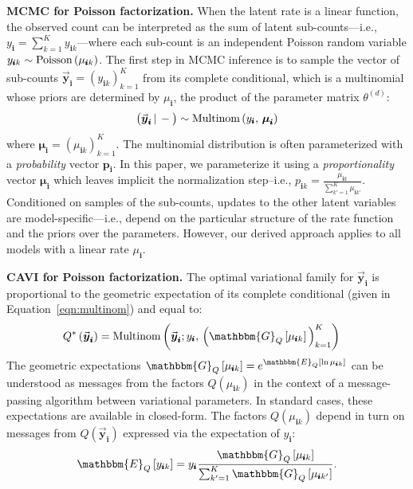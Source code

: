 \documentclass{article}
\newcommand{\subs}{\pmb{i}}
\newcommand{\ysk}{y_{\subs k}}
\newcommand{\ys}{y_{\subs}}
\newcommand{\mus}{\mu_{\subs}}
\newcommand{\musk}{\mu_{\subs k}}
\newcommand{\yvs}{\vec{\boldsymbol{y}}_{\subs}}
\newcommand{\Multi}[1]{\textup{Multinom}\left( #1 \right)}
\newcommand{\Pois}[1]{\textup{Poisson}\left( #1 \right)}
\newcommand{\Eq}[1]{\mathbbm{E}_Q\left[#1\right]}
\newcommand{\Gq}[1]{\mathbbm{G}_Q\left[#1\right]}
\newcommand{\given}{\,|\,}
\newcommand{\teq}{\!=\!}
\newcommand{\compcond}[1]{\big(#1\given-\big)}
\begin{document}
  \textbf{MCMC for Poisson factorization.} When the latent rate is a linear
  function, the observed count can be interpreted as the sum of latent
  sub-counts---i.e., $\ys = \sum_{k=1}^K \ysk$---where each sub-count is an
  independent Poisson random variable $\ysk \sim \Pois{\musk}$. The first step
  in MCMC inference is to sample the vector of sub-counts $\yvs \teq
  \left(\ysk\right)_{k=1}^K$ from its complete conditional, which is a
  multinomial whose priors are determined by $\mus$, the product of the
  parameter matrix $\theta^{(d)}$:
  \begin{equation}
  \label{eqn:multinom}
  \compcond{\yvs} \sim \Multi{\ys,\, \boldsymbol{\mu}_{\subs}}
  \end{equation}
  where $\boldsymbol{\mu}_{\subs}\teq \left(\musk\right)_{k=1}^K$. The
  multinomial distribution is often parameterized with a \emph{probability}
  vector $\boldsymbol{p}_{\subs}$. In this paper, we parameterize it using a
  \emph{proportionality} vector $\boldsymbol{\mu}_{\subs}$ which leaves implicit
  the normalization step--i.e., $p_{\subs k} = \frac{\musk}{\sum_{k'=1}^K
  \mu_{\subs k'}}$. Conditioned on samples of the sub-counts, updates to the
  other latent variables are model-specific---i.e., depend on the particular
  structure of the rate function and the priors over the parameters. However,
  our derived approach applies to all models with a linear rate $\mus$. 
  
  \textbf{CAVI for Poisson factorization.} The optimal variational family for
  $\yvs$ is proportional to the geometric expectation of its complete
  conditional (given in Equation~\ref{eqn:multinom}) and equal to:
  \begin{align}
  Q^*\left(\yvs\right) 
  &= \Multi{\yvs; \ys,\, \Big(\Gq{\musk}\Big)_{k=1}^K}
  \end{align}
  The geometric expectations $\Gq{\musk} = e^{\Eq{\ln \musk}}$ can be understood
  as messages from the factors $Q(\musk)$ in the context of a message-passing
  algorithm between variational parameters. In standard cases, these
  expectations are available in closed-form. The factors $Q(\musk)$ depend in
  turn on messages from $Q(\yvs)$ expressed via the expectation of $\ys$:
  \begin{equation}
      \Eq{\ysk}=\ys\frac{\Gq{\musk}}{\sum_{k'=1}^K \Gq{\mu_{\subs k'}}}.
  \end{equation}
  
\end{document}

